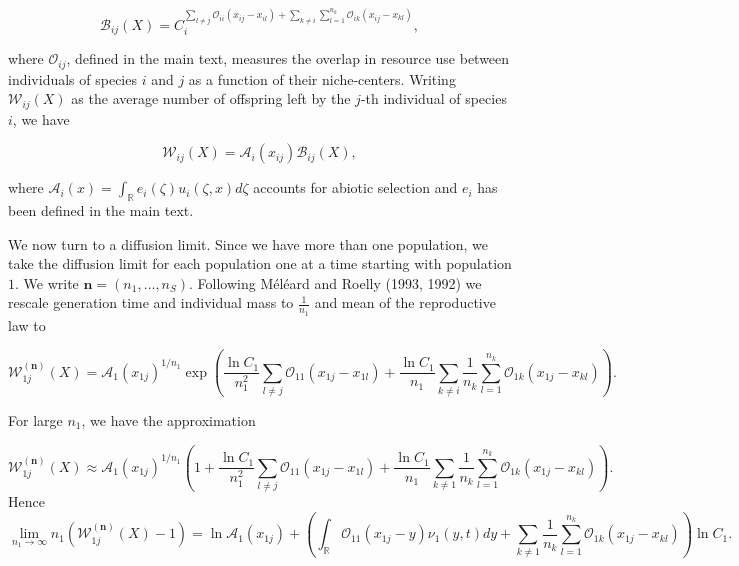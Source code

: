 \documentclass[]{article}
\begin{document}
\begin{equation}
\mathscr B_{ij}(X)=C_i^{\sum_{l\neq j}\mathcal{O}_{ii}(x_{ij}-x_{il})+\sum_{k\neq i}\sum_{l=1}^{n_k}\mathcal{O}_{ik}(x_{ij}-x_{kl})},
\end{equation}

where \(\mathcal{O}_{ij}\), defined in the main text, measures the
overlap in resource use between individuals of species \(i\) and \(j\)
as a function of their niche-centers. Writing \(\mathscr W_{ij}(X)\) as
the average number of offspring left by the \(j\)-th individual of
species \(i\), we have

\begin{equation}
\mathscr W_{ij}(X)=\mathscr{A}_i(x_{ij})\mathscr{B}_{ij}(X),
\end{equation}

where \(\mathscr{A}_i(x)=\int_\mathbb{R}e_i(\zeta)u_i(\zeta,x)d\zeta\)
accounts for abiotic selection and \(e_i\) has been defined in the main
text.

We now turn to a diffusion limit. Since we have more than one
population, we take the diffusion limit for each population one at a
time starting with population \(1\). We write
\(\pmb n=(n_1,\dots,n_S)\). Following Méléard and Roelly (1993, 1992) we
rescale generation time and individual mass to \(\frac{1}{n_1}\) and
mean of the reproductive law to

\begin{equation}
\mathscr W_{1j}^{(\pmb n)}(X)=\mathscr{A}_1(x_{1j})^{1/n_1}\exp\left(\frac{\ln C_1}{n_1^2}\sum_{l\neq j}\mathcal{O}_{11}(x_{1j}-x_{1l})+\frac{\ln C_1}{n_1}\sum_{k\neq i}\frac{1}{n_k}\sum_{l=1}^{n_k}\mathcal{O}_{1k}(x_{1j}-x_{kl})\right).
\end{equation}

For large \(n_1\), we have the approximation

\begin{equation}
\mathscr W_{1j}^{(\pmb n)}(X)\approx\mathscr{A}_1(x_{1j})^{1/n_1}\left(1+\frac{\ln C_1}{n_1^2}\sum_{l\neq j}\mathcal{O}_{11}(x_{1j}-x_{1l})+\frac{\ln C_1}{n_1}\sum_{k\neq 1}\frac{1}{n_k}\sum_{l=1}^{n_k}\mathcal{O}_{1k}(x_{1j}-x_{kl})\right).
\end{equation} Hence \begin{equation}
\lim_{n_1\to\infty}n_1\left(\mathscr W_{1j}^{(\pmb n)}(X)-1\right)=\ln\mathscr{A}_1(x_{1j})+\left(\int_\mathbb{R}\mathcal{O}_{11}(x_{1j}-y)\nu_1(y,t)dy+\sum_{k\neq 1}\frac{1}{n_k}\sum_{l=1}^{n_k}\mathcal{O}_{1k}(x_{1j}-x_{kl})\right)\ln C_1.
\end{equation}
\end{document}
